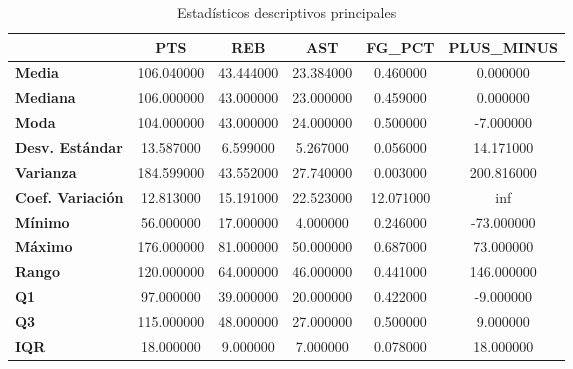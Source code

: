 \begin{table}[H]
\centering
\small
\begin{table}
\caption{Estadísticos descriptivos principales}
\label{tab:estadisticos_descriptivos}
\begin{tabular}{|l|c|c|c|c|c|}
\toprule
 & PTS & REB & AST & FG_PCT & PLUS_MINUS \\
\midrule
\textbf{Media} & 106.040000 & 43.444000 & 23.384000 & 0.460000 & 0.000000 \\
\textbf{Mediana} & 106.000000 & 43.000000 & 23.000000 & 0.459000 & 0.000000 \\
\textbf{Moda} & 104.000000 & 43.000000 & 24.000000 & 0.500000 & -7.000000 \\
\textbf{Desv. Estándar} & 13.587000 & 6.599000 & 5.267000 & 0.056000 & 14.171000 \\
\textbf{Varianza} & 184.599000 & 43.552000 & 27.740000 & 0.003000 & 200.816000 \\
\textbf{Coef. Variación} & 12.813000 & 15.191000 & 22.523000 & 12.071000 & inf \\
\textbf{Mínimo} & 56.000000 & 17.000000 & 4.000000 & 0.246000 & -73.000000 \\
\textbf{Máximo} & 176.000000 & 81.000000 & 50.000000 & 0.687000 & 73.000000 \\
\textbf{Rango} & 120.000000 & 64.000000 & 46.000000 & 0.441000 & 146.000000 \\
\textbf{Q1} & 97.000000 & 39.000000 & 20.000000 & 0.422000 & -9.000000 \\
\textbf{Q3} & 115.000000 & 48.000000 & 27.000000 & 0.500000 & 9.000000 \\
\textbf{IQR} & 18.000000 & 9.000000 & 7.000000 & 0.078000 & 18.000000 \\
\bottomrule
\end{tabular}
\end{table}

\end{table}
